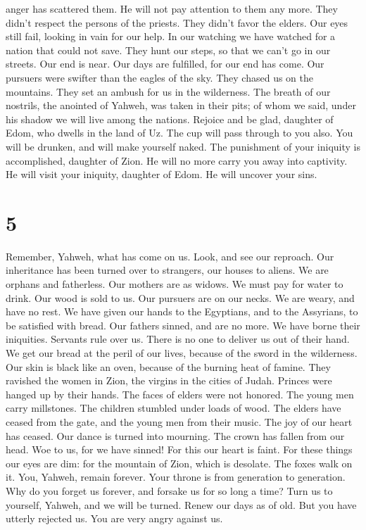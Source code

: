 anger has scattered them. He will not pay attention to them any more.
They didn't respect the persons of the priests. They didn't favor the
elders.  Our eyes still fail, looking in vain for our
help. In our watching we have watched for a nation that could not save.
 They hunt our steps, so that we can't go in our streets.
Our end is near. Our days are fulfilled, for our end has come.
 Our pursuers were swifter than the eagles of the sky.
They chased us on the mountains. They set an ambush for us in the
wilderness.  The breath of our nostrils, the anointed of
Yahweh, was taken in their pits; of whom we said, under his shadow we
will live among the nations.  Rejoice and be glad,
daughter of Edom, who dwells in the land of Uz. The cup will pass
through to you also. You will be drunken, and will make yourself naked.
 The punishment of your iniquity is accomplished,
daughter of Zion. He will no more carry you away into captivity. He will
visit your iniquity, daughter of Edom. He will uncover your sins.

\hypertarget{section-4}{%
\section{5}\label{section-4}}

 Remember, Yahweh, what has come on us. Look, and see our
reproach.  Our inheritance has been turned over to
strangers, our houses to aliens.  We are orphans and
fatherless. Our mothers are as widows.  We must pay for
water to drink. Our wood is sold to us.  Our pursuers are
on our necks. We are weary, and have no rest.  We have
given our hands to the Egyptians, and to the Assyrians, to be satisfied
with bread.  Our fathers sinned, and are no more. We have
borne their iniquities.  Servants rule over us. There is
no one to deliver us out of their hand.  We get our bread
at the peril of our lives, because of the sword in the wilderness.
 Our skin is black like an oven, because of the burning
heat of famine.  They ravished the women in Zion, the
virgins in the cities of Judah.  Princes were hanged up
by their hands. The faces of elders were not honored. 
The young men carry millstones. The children stumbled under loads of
wood.  The elders have ceased from the gate, and the
young men from their music.  The joy of our heart has
ceased. Our dance is turned into mourning.  The crown has
fallen from our head. Woe to us, for we have sinned!  For
this our heart is faint. For these things our eyes are dim:
 for the mountain of Zion, which is desolate. The foxes
walk on it.  You, Yahweh, remain forever. Your throne is
from generation to generation.  Why do you forget us
forever, and forsake us for so long a time?  Turn us to
yourself, Yahweh, and we will be turned. Renew our days as of old.
 But you have utterly rejected us. You are very angry
against us.
